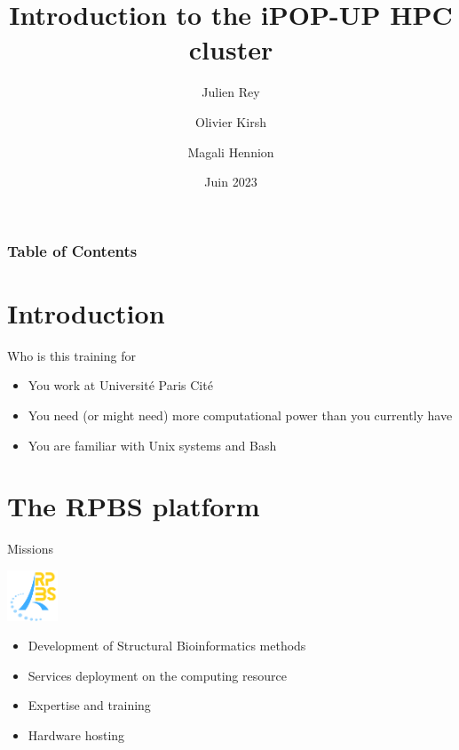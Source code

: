\documentclass{beamer}
\title{Introduction to the iPOP-UP HPC cluster}
\author[Rey, Kirsh and Hennion]{Julien Rey \and Olivier Kirsh \and Magali Hennion}
\date{Juin 2023}
\begin{document}
{
\begin{frame}
    \maketitle
\end{frame}
}

\begin{frame}
\frametitle{Table of Contents}
\tableofcontents
\end{frame}

\section{Introduction}
\begin{frame}[fragile]{Who is this training for}
    \begin{itemize}
        \item You work at Université Paris Cité
        \item You need (or might need) more computational power than you currently have
        \item You are familiar with Unix systems and Bash
    \end{itemize}
\end{frame}

\section{The RPBS platform}
\begin{frame}[fragile]{Missions}
    \begin{center}
        \includegraphics[height = 1.5cm]{Logo/RPBS.png}
    \end{center}
    \begin{itemize}
        \item Development of Structural Bioinformatics methods
        \item Services deployment on the computing resource
        \item Expertise and training
        \item Hardware hosting
    \end{itemize}
\end{frame}
\end{document}
